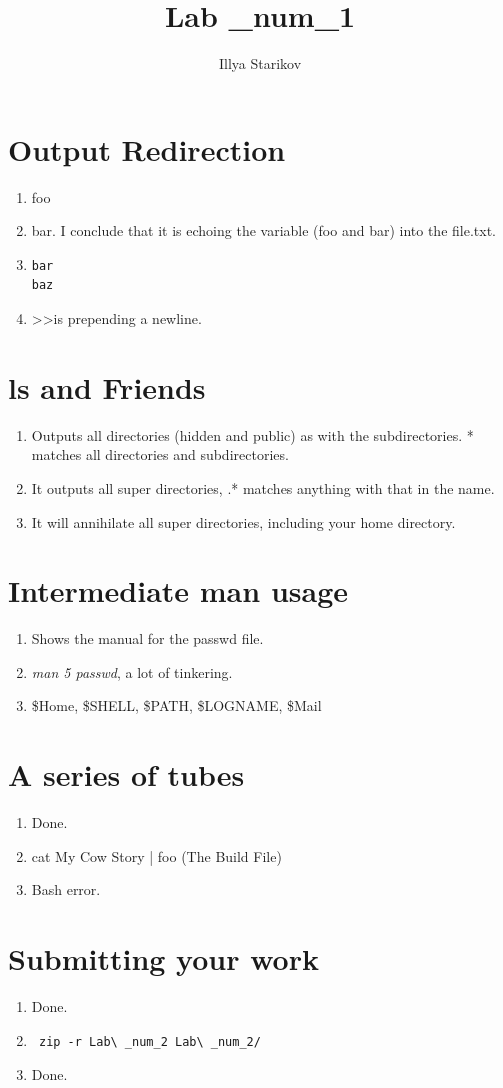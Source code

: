 \documentclass{article}
\begin{document}
\author{Illya Starikov}
\title{Lab \_num_1}

\maketitle

\section{Output Redirection}
\begin{enumerate}
\item foo
\item bar. I conclude that it is echoing the variable (foo and bar) into the file.txt.
\item \begin{verbatim}
bar
baz
\end{verbatim}
\item \textgreater \textgreater is prepending a newline.
\end{enumerate}

\section{ls and Friends}
\begin{enumerate}
\item Outputs all directories (hidden and public) as with the subdirectories. * matches all directories and subdirectories.
\item It outputs all super directories, .* matches anything with that in the name.
\item It will annihilate all super directories, including your home directory.
\end{enumerate}

\section{Intermediate man usage}
\begin{enumerate}
\item Shows the manual for the passwd file.
\item \textit{man 5 passwd}, a lot of tinkering.
\item \$Home, \$SHELL, \$PATH, \$LOGNAME, \$Mail
\end{enumerate}

\section{A series of tubes}
\begin{enumerate}
\item Done.
\item cat My Cow Story | foo (The Build File)
\item Bash error.
\end{enumerate}

\section{Submitting your work}
\begin{enumerate}
\item Done.
\item \begin{verbatim} zip -r Lab\ _num_2 Lab\ _num_2/ \end{verbatim}
\item Done.
\end{enumerate}
\end{document}
